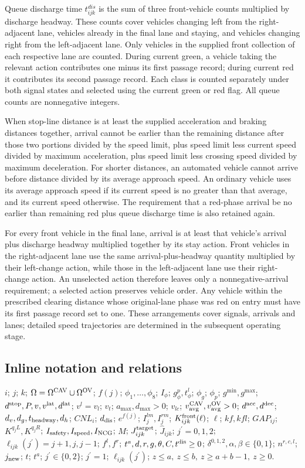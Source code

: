 \documentclass[10pt]{article}
\begin{document}
Queue discharge time $t^{dis}_{ijk}$ is the sum of three front-vehicle counts multiplied by discharge headway. These counts cover vehicles changing left from the right-adjacent lane, vehicles already in the final lane and staying, and vehicles changing right from the left-adjacent lane. Only vehicles in the supplied front collection of each respective lane are counted. During current green, a vehicle taking the relevant action contributes one minus its first passage record; during current red it contributes its second passage record. Each class is counted separately under both signal states and selected using the current green or red flag. All queue counts are nonnegative integers.

When stop-line distance is at least the supplied acceleration and braking distances together, arrival cannot be earlier than the remaining distance after those two portions divided by the speed limit, plus speed limit less current speed divided by maximum acceleration, plus speed limit less crossing speed divided by maximum deceleration. For shorter distances, an automated vehicle cannot arrive before distance divided by its average approach speed. An ordinary vehicle uses its average approach speed if its current speed is no greater than that average, and its current speed otherwise. The requirement that a red-phase arrival be no earlier than remaining red plus queue discharge time is also retained again.

For every front vehicle in the final lane, arrival is at least that vehicle's arrival plus discharge headway multiplied together by its stay action. Front vehicles in the right-adjacent lane use the same arrival-plus-headway quantity multiplied by their left-change action, while those in the left-adjacent lane use their right-change action. An unselected action therefore leaves only a nonnegative-arrival requirement; a selected action preserves vehicle order. Any vehicle within the prescribed clearing distance whose original-lane phase was red on entry must have its first passage record set to one. These arrangements cover signals, arrivals and lanes; detailed speed trajectories are determined in the subsequent operating stage.

\subsection*{Inline notation and relations}
$i$; $j$; $k$; $\Omega=\Omega^{\rm CAV}\cup\Omega^{\rm OV}$; $f(j)$; $\phi_1,\ldots,\phi_8$; $I_\phi$; $g_\phi^p,t_\phi^l$; $\phi_g$; $\phi_p$; $g^{\min},g^{\max}$; $d^{\rm stop},P,v,v^{\rm lat},d^{\rm lat}$; $v^l=v_l$; $v_t$; $a_{\max},d_{\max}>0$; $v_{lc}$; $v_{\rm avg}^{\rm CAV},v_{\rm avg}^{\rm OV}>0$; $d^{\rm acc},d^{\rm dec}$; $d_v,d_g,t_{\rm headway},d_h$; $CNL_i$; $d_{\rm dis}$; $e^{f(j)}$; $I_j^{lm},I_j^{rm}$; $K^{\rm front}_{ijk}(\ell)$; $\ell$; $kf,kfl$; $GAP_{ij}$; $K^{q_jL},K^{q_jR}$; $I_{\rm safety},I_{\rm speed},I_{\rm NCG}$; $M$; $J^{\rm target}_{ijk}$; $\widehat J_{ijk}$; $j^{\prime}=0,1,2$; $\ell_{ijk}(j^{\prime})=j+1,j,j-1$; $f^l,f^r$; $t^a,d,r,g,\theta,C,t^{\rm dis}\ge0$; $\delta^{0,1,2},\alpha,\beta\in\{0,1\}$; $n^{r,c,l}$; $j_{\rm new}$; $t$; $t^a$; $j^{\prime}\in\{0,2\}$; $j^{\prime}=1$; $\ell_{ijk}(j^{\prime})$; $z\le a,\ z\le b,\ z\ge a+b-1,\ z\ge0$.
\end{document}
